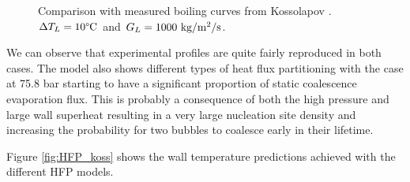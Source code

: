 \begin{figure}[!h]
\centering
{}
\caption{Comparison with measured boiling curves from Kossolapov \cite{kossolapov_experimental_2021}. $\Delta T_{L}=10\degree\mathrm{C}$ and $G_{L}=1000~\text{kg/m$^{2}$/s}$.}
\label{fig:HFP_koss_BC}
\end{figure}


\npar

We can observe that experimental profiles are quite fairly reproduced in both cases. The model also shows different types of heat flux partitioning with the case at 75.8 bar starting to have a significant proportion of static coalescence evaporation flux. This is probably a consequence of both the high pressure and large wall superheat resulting in a very large nucleation site density and increasing the probability for two bubbles to coalesce early in their lifetime.

\npar

Figure \ref{fig:HFP_koss} shows the wall temperature predictions achieved with the different HFP models.


